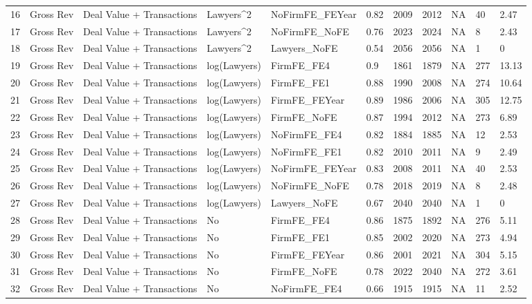 \documentclass{article}
\begin{document}
\begin{table}[H]
\begin{tabular}{rllllllllll}
  16 & Gross Rev & Deal Value + Transactions & Lawyers^2 & NoFirmFE\_FEYear & 0.82 & 2009 & 2012 & NA & 40 & 2.47 \\ 
  17 & Gross Rev & Deal Value + Transactions & Lawyers^2 & NoFirmFE\_NoFE & 0.76 & 2023 & 2024 & NA & 8 & 2.43 \\ 
  18 & Gross Rev & Deal Value + Transactions & Lawyers^2 & Lawyers\_NoFE & 0.54 & 2056 & 2056 & NA & 1 & 0 \\ 
  19 & Gross Rev & Deal Value + Transactions & log(Lawyers) & FirmFE\_FE4 & 0.9 & 1861 & 1879 & NA & 277 & 13.13 \\ 
  20 & Gross Rev & Deal Value + Transactions & log(Lawyers) & FirmFE\_FE1 & 0.88 & 1990 & 2008 & NA & 274 & 10.64 \\ 
  21 & Gross Rev & Deal Value + Transactions & log(Lawyers) & FirmFE\_FEYear & 0.89 & 1986 & 2006 & NA & 305 & 12.75 \\ 
  22 & Gross Rev & Deal Value + Transactions & log(Lawyers) & FirmFE\_NoFE & 0.87 & 1994 & 2012 & NA & 273 & 6.89 \\ 
  23 & Gross Rev & Deal Value + Transactions & log(Lawyers) & NoFirmFE\_FE4 & 0.82 & 1884 & 1885 & NA & 12 & 2.53 \\ 
  24 & Gross Rev & Deal Value + Transactions & log(Lawyers) & NoFirmFE\_FE1 & 0.82 & 2010 & 2011 & NA & 9 & 2.49 \\ 
  25 & Gross Rev & Deal Value + Transactions & log(Lawyers) & NoFirmFE\_FEYear & 0.83 & 2008 & 2011 & NA & 40 & 2.53 \\ 
  26 & Gross Rev & Deal Value + Transactions & log(Lawyers) & NoFirmFE\_NoFE & 0.78 & 2018 & 2019 & NA & 8 & 2.48 \\ 
  27 & Gross Rev & Deal Value + Transactions & log(Lawyers) & Lawyers\_NoFE & 0.67 & 2040 & 2040 & NA & 1 & 0 \\ 
  28 & Gross Rev & Deal Value + Transactions & No & FirmFE\_FE4 & 0.86 & 1875 & 1892 & NA & 276 & 5.11 \\ 
  29 & Gross Rev & Deal Value + Transactions & No & FirmFE\_FE1 & 0.85 & 2002 & 2020 & NA & 273 & 4.94 \\ 
  30 & Gross Rev & Deal Value + Transactions & No & FirmFE\_FEYear & 0.86 & 2001 & 2021 & NA & 304 & 5.15 \\ 
  31 & Gross Rev & Deal Value + Transactions & No & FirmFE\_NoFE & 0.78 & 2022 & 2040 & NA & 272 & 3.61 \\ 
  32 & Gross Rev & Deal Value + Transactions & No & NoFirmFE\_FE4 & 0.66 & 1915 & 1915 & NA & 11 & 2.52 \\ 

\end{tabular}
\end{table}
\end{document}
